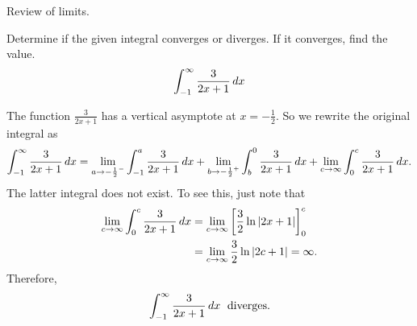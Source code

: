 \documentclass[noinstructornotes]{ximera}
\begin{document}
\begin{instructorNotes}
Review of limits.
\end{instructorNotes}








\begin{problem}
Determine if the given integral converges or diverges.  
If it converges, find the value.
	\begin{equation*}
	 \int_{-1}^{\infty} \frac{3}{2x+1} \,d x
	\end{equation*}
	\begin{freeResponse}
	The function $\frac{3}{2x+1}$ has a vertical asymptote at $x=- \frac{1}{2}$.  
	So we rewrite the original integral as
		\[
		\int_{-1}^{\infty} \frac{3}{2x+1} \,d x = \lim_{a \to -\frac{1}{2}^-} \int_{-1}^a \frac{3}{2x+1} \,d x  
		+ \lim_{b \to -\frac{1}{2}^+} \int_b^0 \frac{3}{2x+1} \,d x + \lim_{c \to \infty} \int_0^c \frac{3}{2x+1} \,d x.
		\]
	The latter integral does not exist.  
	To see this, just note that
		\begin{align*}
		 \lim_{c \to \infty} \int_0^c \frac{3}{2x+1} \,d x 
		 &= \lim_{c \to \infty} \bigg[ \frac{3}{2} \ln|2x+1| \bigg]_0^c  \\
		 &= \lim_{c \to \infty} \frac{3}{2} \ln|2c+1| = \infty.
		\end{align*}
	Therefore, 
		\[
		\int_{-1}^{\infty} \frac{3}{2x+1} \,d x \; \text{ diverges.}
		\]
	\end{freeResponse}


\end{problem}
\end{document}
